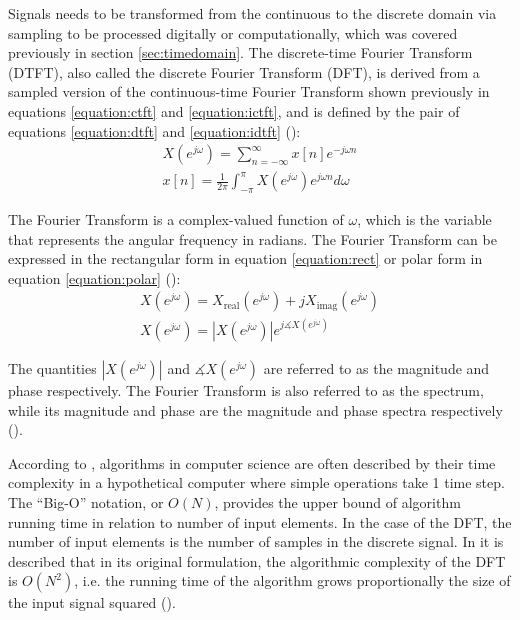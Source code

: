 \documentclass[report.tex]{subfiles}
\begin{document}
Signals needs to be transformed from the continuous to the discrete domain via sampling to be processed digitally or computationally, which was covered previously in section \ref{sec:timedomain}. The discrete-time Fourier Transform (DTFT), also called the discrete Fourier Transform (DFT), is derived from a sampled version of the continuous-time Fourier Transform shown previously in equations \eqref{equation:ctft} and \eqref{equation:ictft}, and is defined by the pair of equations \eqref{equation:dtft} and \eqref{equation:idtft} (\cite[289]{melbook}):
\begin{align}
	X(e^{j\omega}) = \sum_{n = -\infty}^{\infty}{x[n]e^{-j\omega n}} \tag{3}\label{equation:dtft} \\
	x[n] = \frac{1}{2\pi}\int_{-\pi}^{\pi}{X(e^{j\omega})e^{j\omega n}\mathit{d\omega}} \tag{4}\label{equation:idtft}
\end{align}

The Fourier Transform is a complex-valued function of $\omega$, which is the variable that represents the angular frequency in radians. The Fourier Transform can be expressed in the rectangular form in equation \eqref{equation:rect} or polar form in equation \eqref{equation:polar} (\cite[49]{discretebook}):
\begin{align}
	X(e^{j\omega}) = X_{\text{real}}(e^{j\omega}) + j X_{\text{imag}}(e^{j\omega}) \tag{5}\label{equation:rect} \\
	X(e^{j\omega}) = |X(e^{j\omega})|e^{j\measuredangle X(e^{j\omega})} \tag{6}\label{equation:polar}
\end{align}

The quantities $|X(e^{j\omega})|$ and $\measuredangle X(e^{j\omega})$ are referred to as the magnitude and phase respectively. The Fourier Transform is also referred to as the spectrum, while its magnitude and phase are the magnitude and phase spectra respectively (\cite{discretebook}).

According to \textcite{skiena}, algorithms in computer science are often described by their time complexity in a hypothetical computer where simple operations take 1 time step. The ``Big-O'' notation, or $O(N)$, provides the upper bound of algorithm running time in relation to number of input elements. In the case of the DFT, the number of input elements is the number of samples in the discrete signal. In \textcite[Chapter~9]{discretebook} it is described that in its original formulation, the algorithmic complexity of the DFT is $O(N^{2})$, i.e. the running time of the algorithm grows proportionally the size of the input signal squared (\cite{skiena}). 
\end{document}
